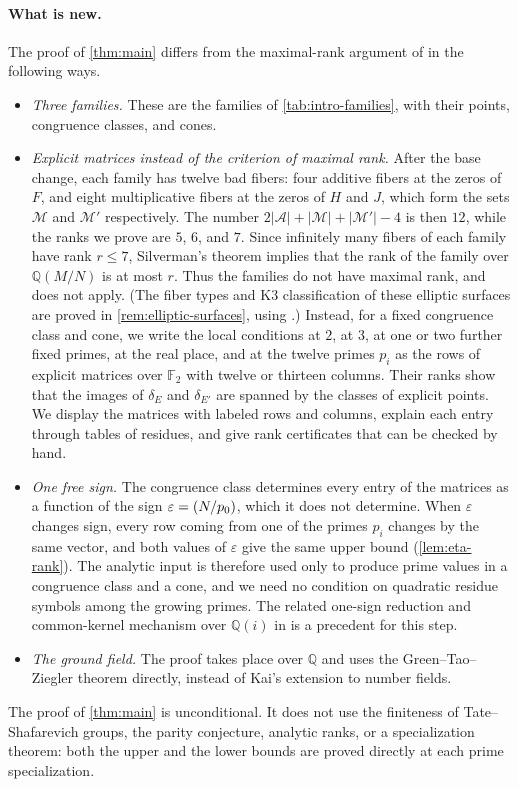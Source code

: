 \documentclass[12pt,oneside,openany]{book}
\theoremstyle{definition}
\theoremstyle{plain}
\numberwithin{equation}{chapter}
\theoremstyle{plain}
\theoremstyle{definition}
\theoremstyle{remark}
\newcommand{\Q}{\mathbb Q}
\newcommand{\F}{\mathbb F}
\newcommand{\leg}[2]{\mathchoice{\left(\frac{#1}{#2}\right)}{(#1/#2)}{(#1/#2)}{(#1/#2)}}
\newcommand{\eps}{\varepsilon}
\begin{document}
\paragraph{What is new.} The proof of \cref{thm:main} differs from the maximal-rank argument of \cite{Zywina2026} in the following ways.
\begin{itemize}
\item \emph{Three families.} These are the families of \cref{tab:intro-families}, with their points, congruence classes, and cones.
\item \emph{Explicit matrices instead of the criterion of maximal rank.} After the base change, each family has twelve bad fibers: four additive fibers at the zeros of $F$, and eight multiplicative fibers at the zeros of $H$ and $J$, which form the sets $\mathcal M$ and $\mathcal M'$ respectively. The number $2|\mathcal A|+|\mathcal M|+|\mathcal M'|-4$ is then $12$, while the ranks we prove are $5$, $6$, and $7$. Since infinitely many fibers of each family have rank $r\le 7$, Silverman's theorem \cite[Theorem~C, p.~208]{Silverman1983} implies that the rank of the family over $\Q(M/N)$ is at most $r$. Thus the families do not have maximal rank, and \cite[Theorem~4.1]{Zywina2026} does not apply. (The fiber types and K3 classification of these elliptic surfaces are proved in \cref{rem:elliptic-surfaces}, using \cite{Tate1975,SchuttShioda2010}.) Instead, for a fixed congruence class and cone, we write the local conditions at $2$, at $3$, at one or two further fixed primes, at the real place, and at the twelve primes $p_i$ as the rows of explicit matrices over $\F_2$ with twelve or thirteen columns. Their ranks show that the images of $\delta_E$ and $\delta_{E'}$ are spanned by the classes of explicit points. We display the matrices with labeled rows and columns, explain each entry through tables of residues, and give rank certificates that can be checked by hand.
\item \emph{One free sign.} The congruence class determines every entry of the matrices as a function of the sign $\eps=\leg{N}{p_0}$, which it does not determine. When $\eps$ changes sign, every row coming from one of the primes $p_i$ changes by the same vector, and both values of $\eps$ give the same upper bound (\cref{lem:eta-rank}). The analytic input is therefore used only to produce prime values in a congruence class and a cone, and we need no condition on quadratic residue symbols among the growing primes. The related one-sign reduction and common-kernel mechanism over $\Q(i)$ in \cite[Lemmas~4.1--4.2]{Savoie2026} is a precedent for this step.
\item \emph{The ground field.} The proof takes place over $\Q$ and uses the Green--Tao--Ziegler theorem directly, instead of Kai's extension to number fields.
\end{itemize}
The proof of \cref{thm:main} is unconditional. It does not use the finiteness of Tate--Shafarevich groups, the parity conjecture, analytic ranks, or a specialization theorem: both the upper and the lower bounds are proved directly at each prime specialization.
\end{document}
